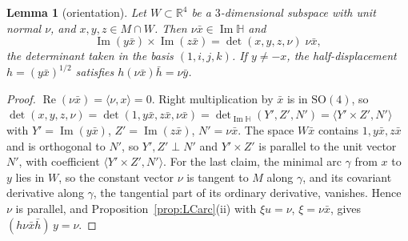 \documentclass[11pt,reqno]{amsart}
\newtheorem{lemma}[theorem]{Lemma}
\theoremstyle{definition}
\theoremstyle{remark}
\numberwithin{equation}{section}
\newcommand{\R}{\mathbb{R}}
\newcommand{\HH}{\mathbb{H}}
\newcommand{\re}{\operatorname{Re}}
\newcommand{\im}{\operatorname{Im}}
\newcommand{\ip}[2]{\langle #1,#2\rangle}
\newcommand{\SO}{\mathrm{SO}}
\begin{document}
\begin{lemma}[orientation]\label{lem:sign}
Let $W\subset\R^4$ be a $3$-dimensional subspace with unit normal $\nu$, and $x,y,z\in M\cap W$.  Then $\nu\bar x\in\im\HH$
and
\[
\im(y\bar x)\times\im(z\bar x)=\det(x,y,z,\nu)\;\nu\bar x ,
\]
the determinant taken in the basis $(1,i,j,k)$.  If $y\ne-x$, the half-displacement $h=(y\bar x)^{1/2}$ satisfies
$h(\nu\bar x)\bar h=\nu\bar y$.
\end{lemma}
\begin{proof}
$\re(\nu\bar x)=\ip\nu x=0$.  Right multiplication by $\bar x$ is in $\SO(4)$, so
$\det(x,y,z,\nu)=\det(1,y\bar x,z\bar x,\nu\bar x)=\det_{\im\HH}(Y',Z',N')=\ip{Y'\times Z'}{N'}$ with $Y'=\im(y\bar x)$,
$Z'=\im(z\bar x)$, $N'=\nu\bar x$.  The space $W\bar x$ contains $1,y\bar x,z\bar x$ and is orthogonal to $N'$, so $Y',Z'\perp N'$
and $Y'\times Z'$ is parallel to the unit vector $N'$, with coefficient $\ip{Y'\times Z'}{N'}$.  For the last claim,
the minimal arc $\gamma$ from $x$ to $y$ lies in $W$, so the constant vector $\nu$ is tangent to $M$ along $\gamma$, and its
covariant derivative along $\gamma$, the tangential part of its ordinary derivative, vanishes.  Hence $\nu$ is parallel,
and Proposition~\ref{prop:LCarc}(ii) with $\xi u=\nu$, $\xi=\nu\bar x$, gives $(h\nu\bar x\bar h)\,y=\nu$.
\end{proof}
\end{document}
